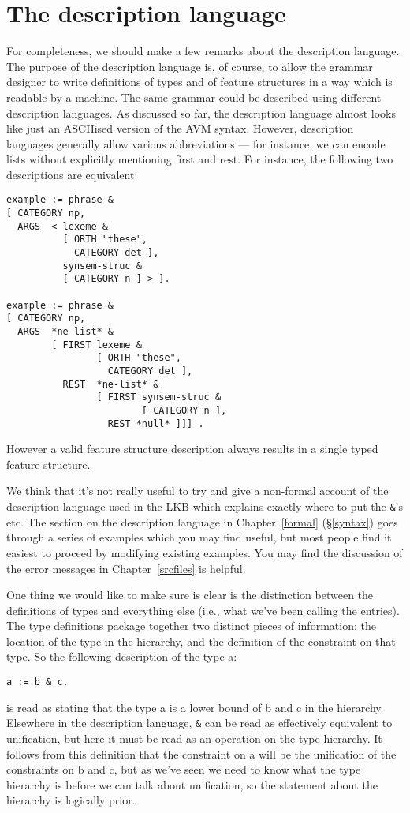 \documentclass[12pt]{report}
\begin{document}
\section{The description language}

For completeness,
we should make a few remarks about the description language.
The purpose of the description language is, of course,
to allow the grammar designer to write definitions of types and of
feature structures in a way which is readable
by a machine.  The same grammar could be described using
different description languages.  As discussed so far, the description
language almost
looks like just an ASCIIised version of the AVM
syntax.  However,
description languages
generally allow various abbreviations --- for instance, we can
encode lists without explicitly mentioning {\feature first}
and {\feature rest}.
For instance, the following two descriptions are equivalent:
\begin{verbatim}
example := phrase &
[ CATEGORY np,
  ARGS  < lexeme &
          [ ORTH "these",
            CATEGORY det ],
          synsem-struc &
          [ CATEGORY n ] > ].

example := phrase &
[ CATEGORY np,
  ARGS  *ne-list* &
        [ FIRST lexeme &
                [ ORTH "these",
                  CATEGORY det ],
          REST  *ne-list* &
                [ FIRST synsem-struc &
                        [ CATEGORY n ],
                  REST *null* ]]] .
\end{verbatim}
However a valid feature structure description always 
results in a single typed feature structure.

We think that
it's not really useful to try and give a
non-formal account of the description language used in the LKB 
which explains exactly where to put the \verb+&+'s etc.
The section on the description language in Chapter~\ref{formal}
(\S\ref{syntax}) goes through a series of examples
which you may find useful, but most people find it easiest
to proceed by modifying existing examples.  You may find the
discussion of the error messages in Chapter~\ref{srcfiles} is helpful.

One thing we would like to make sure is clear is
the distinction between the definitions of types
and everything else (i.e., what we've been calling the entries).
The type definitions
package together two distinct pieces of information: the
location of the type in the hierarchy, 
and the definition of the
constraint on that type.  So the following description of the type {\type a}:
\begin{verbatim}
a := b & c.
\end{verbatim}
is read as stating that the type {\type a} is a
lower bound of {\type b} and {\type c} in the hierarchy.  
Elsewhere in the description language,
\verb+&+ can be read as effectively equivalent to unification,
but here it must be read as an operation on the type
hierarchy.
It follows from this definition
that the constraint on {\type a} will be the unification of 
the constraints on {\type b} and {\type c}, but as we've seen
we need to know what the type hierarchy is before we can 
talk about unification, so the statement about the hierarchy
is logically prior.
\end{document}
